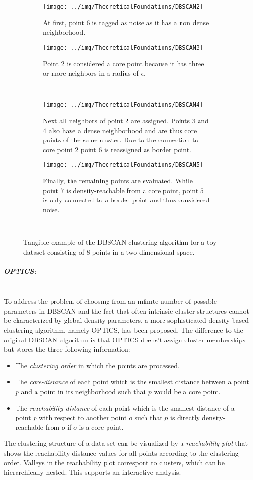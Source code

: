 \begin{figure}[H]
\begin{subfigure}{0.45\textwidth}
\texttt{[image: ../img/TheoreticalFoundations/DBSCAN2]}
\caption{At first, point $6$ is tagged as noise as it has a non dense neighborhood.}\label{fig:DBSCAN2}
\end{subfigure}
\begin{subfigure}{0.45\textwidth}
\texttt{[image: ../img/TheoreticalFoundations/DBSCAN3]}
\caption{Point $2$ is considered a core point because it has three or more neighbors in a radius of $\epsilon$.}\label{fig:DBSCAN3}
\end{subfigure}\\
\begin{subfigure}{0.45\textwidth}
\texttt{[image: ../img/TheoreticalFoundations/DBSCAN4]}
\caption{Next all neighbors of point $2$ are assigned. Points $3$ and $4$ also have a dense neighborhood and are thus core points of the same cluster. Due to the connection to core point $2$ point $6$ is reassigned as border point.}\label{fig:DBSCAN4}
\end{subfigure}
\begin{subfigure}{0.45\textwidth}
\texttt{[image: ../img/TheoreticalFoundations/DBSCAN5]}
\caption{Finally, the remaining points are evaluated. While point $7$ is density-reachable from a core point, point $5$ is only connected to a border point and thus considered noise.}\label{fig:DBSCAN5}
\end{subfigure}\\
\caption{Tangible example of the DBSCAN clustering algorithm for a toy dataset consisting of $8$ points in a two-dimensional space.}
\end{figure}


\subparagraph{OPTICS:}\mbox{}\\
To address the problem of choosing from an infinite number of possible parameters in DBSCAN and the fact that often intrinsic cluster structures cannot be characterized by global density parameters, a more sophisticated density-based clustering algorithm, namely OPTICS, has been proposed. The difference to the original DBSCAN algorithm is that OPTICS doens't assign cluster memberships but stores the three following information:
\begin{itemize}
\item The \textit{clustering order} in which the points are processed.
\item The \textit{core-distance} of each point which is the smallest distance between a point $p$ and a point in its neighborhood such that $p$ would be a core point.
\item The \textit{reachability-distance} of each point which is the smallest distance of a point $p$ with respect to another point $o$ such that $p$ is directly density-reachable from $o$ if $o$ is a core point. 
\end{itemize}  
The clustering structure of a data set can be visualized by a \textit{reachability plot} that shows the reachability-distance values for all points according to the clustering order. Valleys in the reachability plot correspont to clusters, which can be hierarchically nested. This supports an interactive analysis. 
